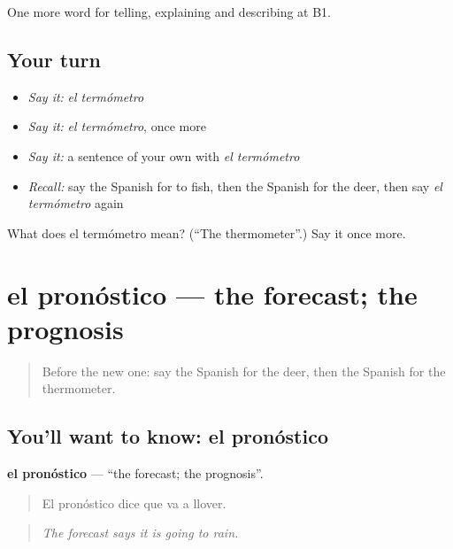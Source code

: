 \begin{grammarlens}[title={What you've built}]
One more word for telling, explaining and describing at B1.
\end{grammarlens}

\subsection*{Your turn}
\begin{itemize}
\raggedright
  \item \emph{Say it:} \emph{el termómetro}
  \item \emph{Say it:} \emph{el termómetro}, once more
  \item \emph{Say it:} a sentence of your own with \emph{el termómetro}
  \item \emph{Recall:} say the Spanish for to fish, then the Spanish for the deer, then say \emph{el termómetro} again
\end{itemize}

\begin{tcolorbox}[breakable,colback=teal!4,colframe=teal!35!black,title={Before you move on}]
What does el termómetro mean? (\textquotedblleft{}The thermometer\textquotedblright{}.) Say it once more.
\end{tcolorbox}
\section[el pronóstico]{el pronóstico — the forecast; the prognosis}

\label{lesson:ES-C696-pronostico}



\begin{quote}
Before the new one: say the Spanish for the deer, then the Spanish for the thermometer.
\end{quote}

\subsection*{You'll want to know: el pronóstico}
\textbf{el pronóstico} — \textquotedblleft{}the forecast; the prognosis\textquotedblright{}.

\begin{quote}
El pronóstico dice que va a llover.
\end{quote}

\begin{quote}
\emph{The forecast says it is going to rain.}
\end{quote}

